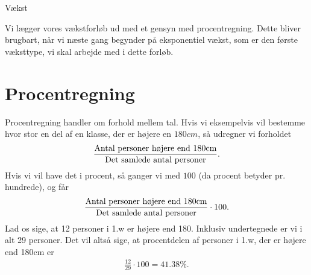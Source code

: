 \begin{center}
\Huge
Vækst
\end{center}
Vi lægger vores vækstforløb ud med et gensyn med procentregning. Dette bliver brugbart, når vi næste gang begynder på eksponentiel vækst, som er den første væksttype, vi skal arbejde med i dette forløb. 
\section*{Procentregning}

Procentregning handler om forhold mellem tal. Hvis vi eksempelvis vil bestemme hvor stor en del af en klasse, der er højere en $180cm$, så udregner vi forholdet 
\begin{align*}
	\frac{\textnormal{Antal personer højere end 180cm}}{\textnormal{Det samlede antal personer}}.
\end{align*}
 Hvis vi vil have det i procent, så ganger vi med $100$ (da procent betyder pr. hundrede), og får
\begin{align*}
	\frac{\textnormal{Antal personer højere end 180cm}}{\textnormal{Det samlede antal personer}}\cdot 100.
\end{align*}
Lad os sige, at 12 personer i 1.w er højere end 180. Inklusiv undertegnede er vi i alt 29 personer. Det vil altså sige, at procentdelen af personer i 1.w, der er højere end 180cm er 
\begin{align*}
\frac{12}{29}\cdot 100 = 41.38\%.
\end{align*}
